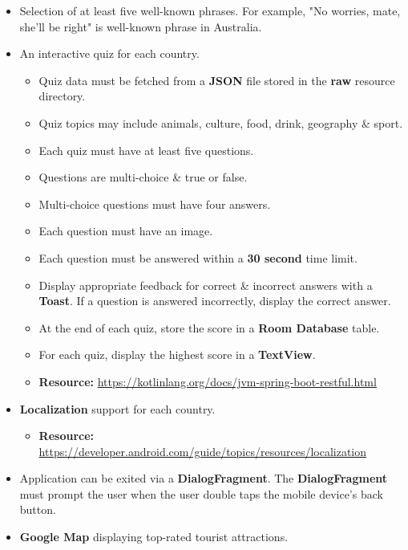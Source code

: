 \documentclass{article}
\begin{document}
\begin{itemize}
\begin{itemize}
	      \end{itemize}
	\item Selection of at least five well-known phrases. For example, "No worries, mate, she'll be right" is well-known phrase in Australia.
	\item An interactive quiz for each country.
	      \begin{itemize}
		      \item Quiz data must be fetched from a \textbf{JSON} file stored in the \textbf{raw} resource directory.
		      \item Quiz topics may include animals, culture, food, drink, geography \& sport.
		      \item Each quiz must have at least five questions.
		      \item Questions are multi-choice \& true or false.
		      \item Multi-choice questions must have four answers.
		      \item Each question must have an image.
		      \item Each question must be answered within a \textbf{30 second} time limit.
		      \item Display appropriate feedback for correct \& incorrect answers with a \textbf{Toast}. If a question is answered incorrectly, display the correct answer.
		      \item At the end of each quiz, store the score in a \textbf{Room Database} table.
		      \item For each quiz, display the highest score in a \textbf{TextView}.
		      \item \textbf{Resource:} \footnotesize\href{https://kotlinlang.org/docs/jvm-spring-boot-restful.html}{https://kotlinlang.org/docs/jvm-spring-boot-restful.html}
	      \end{itemize}
	\item \textbf{Localization} support for each country.
	      \begin{itemize}
		      \item \textbf{Resource:} \footnotesize\href{https://developer.android.com/guide/topics/resources/localization/}{https://developer.android.com/guide/topics/resources/localization}
	      \end{itemize}
	\item Application can be exited via a \textbf{DialogFragment}. The \textbf{DialogFragment} must prompt the user when the user double taps the mobile device's back button.
	\item \textbf{Google Map} displaying top-rated tourist attractions.

\end{itemize}
\end{document}

